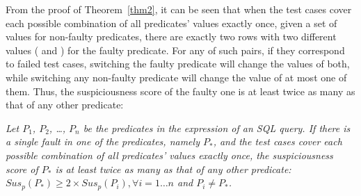 From the proof of Theorem~\ref{thm2}, it can be seen that when the
test cases cover each possible combination of all predicates' values
exactly once, given a set of values for non-faulty predicates, there
are exactly two rows with two different values ( and
) for the faulty predicate. For any of such pairs, if they
correspond to failed test cases, switching the faulty predicate will
change the values of both, while switching any non-faulty predicate
will change the value of at most one of them. Thus, the
suspiciousness score of the faulty one is at least twice as many as
that of any other predicate:


\begin{corollary}
\label{cor}
{\em Let $P_1$, $P_2$, \ldots, $P_n$ be the predicates in the 
expression of an SQL query. If there is a single fault in one of the
predicates, namely $P_*$, and the test cases cover each possible
combination of all predicates' values exactly once, the suspiciousness
score of $P_*$ is at least twice as many as that of any other
predicate:\\ $Sus_p(P_*) \geq 2 \times Sus_p(P_i), \forall i = 1
\ldots n$ and $P_i \neq P_*$.}
\end{corollary}